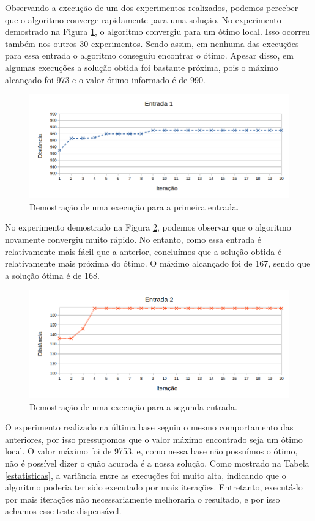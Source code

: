 \documentclass[a4paper, 12pt]{article}
\begin{document}
Observando a execução de um dos experimentos realizados, podemos perceber que o algoritmo converge rapidamente para uma solução. No experimento demostrado na Figura \ref{fig:fig1}, o algoritmo convergiu para um ótimo local. Isso ocorreu também nos outros 30 experimentos. Sendo assim, em nenhuma das execuções para essa entrada o algoritmo conseguiu encontrar o ótimo. Apesar disso, em algumas execuções a solução obtida foi bastante próxima, pois o máximo alcançado foi 973 e o valor ótimo informado é de 990.
\newpage
\begin{figure}[!htb]
\centering
\includegraphics[scale=0.60]{entrada1.png}
\caption{Demostração de uma execução para a primeira entrada.}
\label{fig:fig1}
\end{figure}

No experimento demostrado na Figura \ref{fig:fig2}, podemos observar que o algoritmo novamente convergiu muito rápido. No entanto, como essa entrada é relativamente mais fácil que a anterior, concluímos que a solução obtida é relativamente mais próxima do ótimo. O máximo alcançado foi de 167, sendo que a solução ótima é de 168.

\begin{figure}[!htb]
\centering
\includegraphics[scale=0.60]{entrada2.png}
\caption{Demostração de uma execução para a segunda entrada.}
\label{fig:fig2}
\end{figure}

O experimento realizado na última base seguiu o mesmo comportamento das anteriores, por isso pressupomos que o valor máximo encontrado seja um ótimo local. O valor máximo foi de 9753, e, como nessa base não possuímos o ótimo, não é possível dizer o quão acurada é a nossa solução. Como mostrado na Tabela \ref{estatisticas}, a variância entre as execuções foi muito alta, indicando que o algoritmo poderia ter sido executado por mais iterações. Entretanto, executá-lo por mais iterações não necessariamente melhoraria o resultado, e por isso achamos esse teste dispensável.
\end{document}
